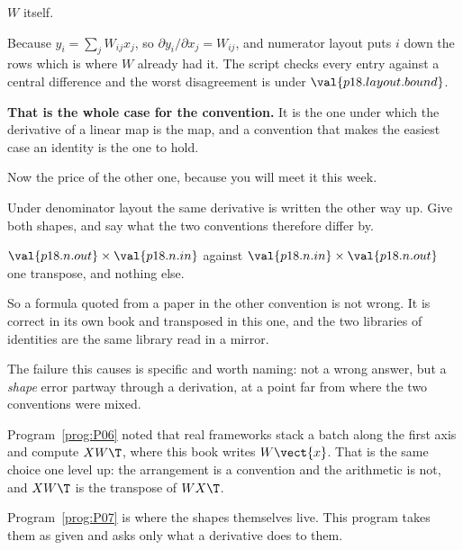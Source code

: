 \begin{fr}
\begin{ansblock}
$W$ itself.
\end{ansblock}

Because $y_i = \sum_j W_{ij}x_j$, so $\partial y_i / \partial x_j = W_{ij}$,
and numerator layout puts $i$ down the rows \dash{} which is where $W$ already
had it. The script checks every entry against a central difference and the
worst disagreement is under $\val{p18.layout.bound}$.

\textbf{That is the whole case for the convention.} It is the one under which
the derivative of a linear map is the map, and a convention that makes the
easiest case an identity is the one to hold.
\end{fr}

\begin{fr}
Now the price of the other one, because you will meet it this week.

Under denominator layout the same derivative is written the other way up.
Give both shapes, and say what the two conventions therefore differ by.
\dotline
\nextframe
\end{fr}

\begin{fr}
\begin{ansblock}
$\val{p18.n.out} \times \val{p18.n.in}$ against $\val{p18.n.in} \times \val{p18.n.out}$ \dash{} one transpose,
and nothing else.
\end{ansblock}

So a formula quoted from a paper in the other convention is not wrong. It is
correct in its own book and transposed in this one, and the two libraries of
identities are the same library read in a mirror.

The failure this causes is specific and worth naming: not a wrong answer, but
a \emph{shape} error partway through a derivation, at a point far from where
the two conventions were mixed.
\end{fr}

\begin{fr}
\begin{note}
Program~\ref{prog:P06} noted that real frameworks stack a batch along the
first axis and compute $XW\T$, where this book writes $W\vect{x}$. That is
the same choice one level up: the arrangement is a convention and the
arithmetic is not, and $XW\T$ is the transpose of $W X\T$.

Program~\ref{prog:P07} is where the shapes themselves live. This program
takes them as given and asks only what a derivative does to them.
\end{note}
\end{fr}

